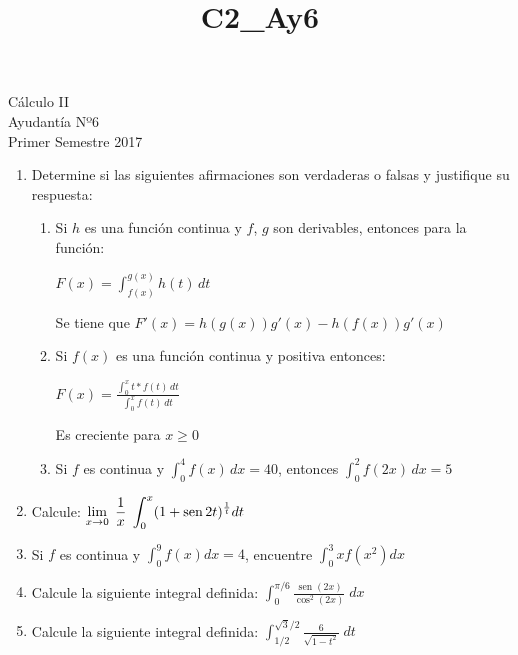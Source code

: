 \documentclass[letterpaper,10pt]{article}
\title{C2_Ay6}
\newcommand{\dis}{\displaystyle}
\def\sin{\operatorname{sen}}
\begin{document}
\begin{center}
Cálculo II\\
Ayudantía Nº6\\
Primer Semestre 2017
\end{center}

\begin{enumerate}
\item Determine si las siguientes afirmaciones son verdaderas o falsas y justifique su respuesta:

\begin{enumerate}[label=\emph{\alph*)}]

\item Si $h$ es una función continua y $f$, $g$ son derivables, entonces para la función:\\
\begin{center}
$\dis F(x) = \int_{f(x)}^{g(x)} h(t)\, dt$
\end{center} 
Se tiene que $F'(x)=h(g(x))g'(x)-h(f(x))g'(x)$

\item Si $f(x)$ es una función continua y positiva entonces:
\begin{center}
$\dis F(x) = \frac{\int_{0}^{x} t * f(t)\, dt}{\int_{0}^{x} f(t)\, dt}$
\end{center} 
Es creciente para $x \geq 0$

\item Si $f$ es continua y $\int_{0}^{4} f(x)\, dx = 40$, entonces $\int_{0}^{2} f(2x)\, dx = 5$
\end{enumerate}
\vspace{2mm}
\item Calcule:
$\displaystyle \lim_{x\to 0} \; {1\over x} \; \int ^x_0 (1 + \sin
2t)^{{1\over t}} dt$


\item Si $f$ es continua y $\displaystyle \int_0^9f(x)dx=4$, encuentre $\displaystyle \int_0^3xf(x^2)dx$

\item Calcule la siguiente integral definida: $\dis \int_{0}^{\pi/6} \frac{\sin(2x)}{\cos^2(2x)} \; dx$


\item Calcule la siguiente integral definida: $\dis \int_{1/2}^{\sqrt{3}/2} \frac{6}{\sqrt{1-t^2}} \; dt$





\end{enumerate}




\vspace{10mm}
\end{document}
